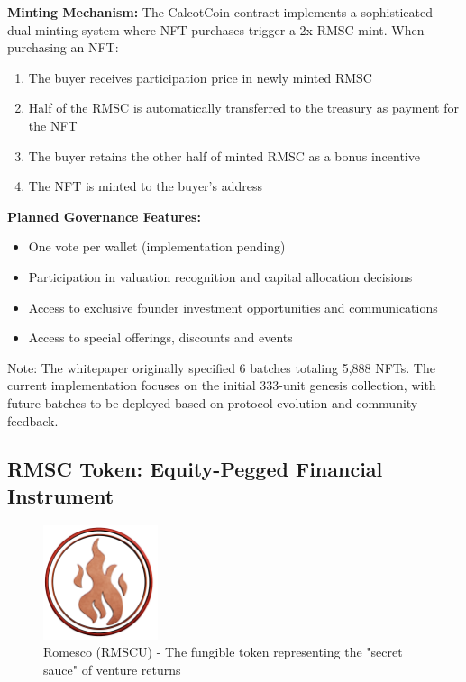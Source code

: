 \documentclass[conference]{IEEEtran}
\begin{document}
\textbf{Minting Mechanism:}
The CalcotCoin contract implements a sophisticated dual-minting system where NFT purchases trigger a 2x RMSC mint. When purchasing an NFT:
\begin{enumerate}
    \item The buyer receives participation price in newly minted RMSC
    \item Half of the RMSC is automatically transferred to the treasury as payment for the NFT
    \item The buyer retains the other half of minted RMSC as a bonus incentive
    \item The NFT is minted to the buyer's address
\end{enumerate}

\textbf{Planned Governance Features:}
\begin{itemize}
    \item One vote per wallet (implementation pending)
    \item Participation in valuation recognition and capital allocation decisions
    \item Access to exclusive founder investment opportunities and communications
    \item Access to special offerings, discounts and events
\end{itemize}

Note: The whitepaper originally specified 6 batches totaling 5,888 NFTs. The current implementation focuses on the initial 333-unit genesis collection, with future batches to be deployed based on protocol evolution and community feedback.

\subsection{RMSC Token: Equity-Pegged Financial Instrument}

\begin{figure}[ht]
\centering
\includegraphics[width=0.3\textwidth]{rmsc_logo.png}
\caption{Romesco (RMSCU) - The fungible token representing the "secret sauce" of venture returns}
\label{fig:rmsc-logo}
\end{figure}
\end{document}
